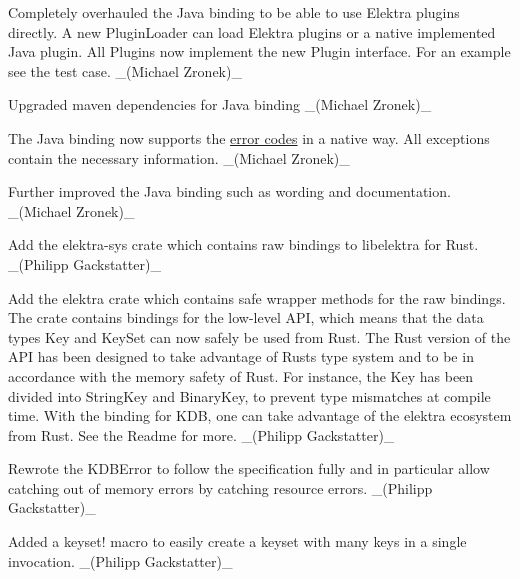 \begin{DoxyItemize}
\item Completely overhauled the Java binding to be able to use Elektra plugins directly. A new Plugin\+Loader can load Elektra plugins or a native implemented Java plugin. All Plugins now implement the new Plugin interface. For an example see the test case. \+\_\+(\+Michael Zronek)\+\_\+
\item Upgraded maven dependencies for Java binding \+\_\+(\+Michael Zronek)\+\_\+
\item The Java binding now supports the \hyperlink{doc_decisions_error_codes_md}{error codes} in a native way. All exceptions contain the necessary information. \+\_\+(\+Michael Zronek)\+\_\+
\item Further improved the Java binding such as wording and documentation. \+\_\+(\+Michael Zronek)\+\_\+
\end{DoxyItemize}


\begin{DoxyItemize}
\item Add the {\ttfamily elektra-\/sys} crate which contains raw bindings to libelektra for Rust. \+\_\+(\+Philipp Gackstatter)\+\_\+
\item Add the {\ttfamily elektra} crate which contains safe wrapper methods for the raw bindings. The crate contains bindings for the low-\/level A\+PI, which means that the data types {\ttfamily Key} and {\ttfamily Key\+Set} can now safely be used from Rust. The Rust version of the A\+PI has been designed to take advantage of Rust\textquotesingle{}s type system and to be in accordance with the memory safety of Rust. For instance, the Key has been divided into {\ttfamily String\+Key} and {\ttfamily Binary\+Key}, to prevent type mismatches at compile time. With the binding for {\ttfamily K\+DB}, one can take advantage of the elektra ecosystem from Rust. See the Readme for more. \+\_\+(\+Philipp Gackstatter)\+\_\+
\item Rewrote the {\ttfamily K\+D\+B\+Error} to follow the specification fully and in particular allow catching out of memory errors by catching resource errors. \+\_\+(\+Philipp Gackstatter)\+\_\+
\item Added a {\ttfamily keyset!} macro to easily create a keyset with many keys in a single invocation. \+\_\+(\+Philipp Gackstatter)\+\_\+
\end{DoxyItemize}


